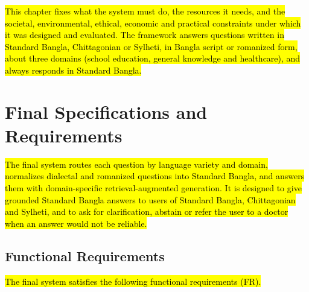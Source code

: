 \hl{This chapter fixes what the system must do, the resources it needs,
and the societal, environmental, ethical, economic and practical
constraints under which it was designed and evaluated. The framework
answers questions written in Standard Bangla, Chittagonian or Sylheti,
in Bangla script or romanized form, about three domains (school
education, general knowledge and healthcare), and always responds in
Standard Bangla.}

\section{Final Specifications and Requirements}\label{final-specifications-and-requirements}

\hl{The final system routes each question by language variety and
domain, normalizes dialectal and romanized questions into Standard
Bangla, and answers them with domain-specific retrieval-augmented
generation. It is designed to give grounded Standard Bangla answers to
users of Standard Bangla, Chittagonian and Sylheti, and to ask for
clarification, abstain or refer the user to a doctor when an answer
would not be reliable.}

\subsection{Functional Requirements}\label{functional-requirements}

\hl{The final system satisfies the following functional requirements
(FR).}

